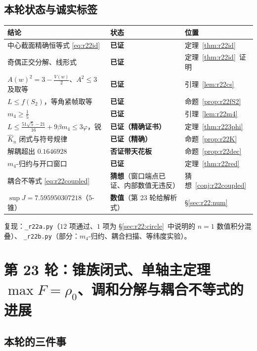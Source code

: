 \documentclass[UTF8,11pt]{ctexart}
\theoremstyle{definition}
\begin{document}
\subsection{本轮状态与诚实标签}\label{sec:r22:status}

\begin{center}\small
\begin{tabular}{lll}
\toprule
结论 & 状态 & 位置\\
\midrule
中心截面精确恒等式 \eqref{eq:r22id} & \textbf{已证} & 定理~\ref{thm:r22id}\\
奇偶正交分解、线形式 & \textbf{已证} & 定理~\ref{thm:r22id}~证明\\
$A(w)^2=3-\frac{V(w)}2$、$A^2\le3$ 及取等 & \textbf{已证} & 引理~\ref{lem:r22cs}\\
$L\le f(S_2)$，等角紧帧取等 & \textbf{已证} & 命题~\ref{prop:r22fS2}\\
$m_4\ge\frac15$ & \textbf{已证} & 引理~\ref{lem:r22m4}\\
$L\le\frac{51\sqrt5-21}{16}+9\beta m_4\le3\varphi$，锐 & \textbf{已证（精确证书）} & 定理~\ref{thm:r223phi}\\
$\hat K_n$ 闭式与符号规律 & \textbf{已证（精确）} & 命题~\ref{prop:r22K}\\
解耦超出 $0.1646928$ & \textbf{否证带天花板} & 命题~\ref{prop:r22dec}\\
$m_4$-归约与开口窗口 & \textbf{已证} & 定理~\ref{thm:r22red}\\
耦合不等式 \eqref{eq:r22coupled} & \textbf{猜想}（窗口端点已证、内部数值无违反） & 猜想~\ref{conj:r22coupled}\\
$\sup J=7.595950307218$（$5$-锥） & \textbf{数值}（第 23 轮给解析式） & \S\ref{sec:r22:num}\\
\bottomrule
\end{tabular}
\end{center}

复现：\texttt{\_r22a.py}（$12$ 项通过、$1$ 项为 \S\ref{sec:r22:circle}~中说明的 $n=1$ 数值积分混叠）、
\texttt{\_r22b.py}（部分：$m_4$-归约、耦合扫描、等纬度实验）。

\section{第 23 轮：锥族闭式、单轴主定理 $\max F=\rho_0$、调和分解与耦合不等式的进展}\label{sec:r23}

\subsection{本轮的三件事}\label{sec:r23:motiv}
\end{document}
